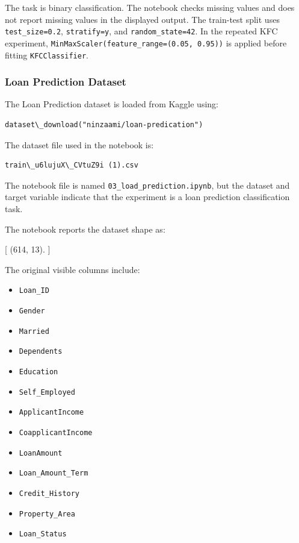 The task is binary classification. The notebook checks missing values and does not report missing values in the displayed output. The train-test split uses \texttt{test\_size=0.2}, \texttt{stratify=y}, and \texttt{random\_state=42}. In the repeated KFC experiment, \texttt{MinMaxScaler(feature\_range=(0.05, 0.95))} is applied before fitting \texttt{KFCClassifier}.

\subsubsection{Loan Prediction Dataset}

The Loan Prediction dataset is loaded from Kaggle using:

\begin{verbatim}
dataset\_download("ninzaami/loan-predication")
\end{verbatim}

The dataset file used in the notebook is:

\begin{verbatim}
train\_u6lujuX\_CVtuZ9i (1).csv
\end{verbatim}

The notebook file is named \texttt{03\_load\_prediction.ipynb}, but the dataset and target variable indicate that the experiment is a loan prediction classification task.

The notebook reports the dataset shape as:

[
    (614, 13).
]

The original visible columns include:

\begin{itemize}
    \item \texttt{Loan\_ID}
    \item \texttt{Gender}
    \item \texttt{Married}
    \item \texttt{Dependents}
    \item \texttt{Education}
    \item \texttt{Self\_Employed}
    \item \texttt{ApplicantIncome}
    \item \texttt{CoapplicantIncome}
    \item \texttt{LoanAmount}
    \item \texttt{Loan\_Amount\_Term}
    \item \texttt{Credit\_History}
    \item \texttt{Property\_Area}
    \item \texttt{Loan\_Status}
\end{itemize}

